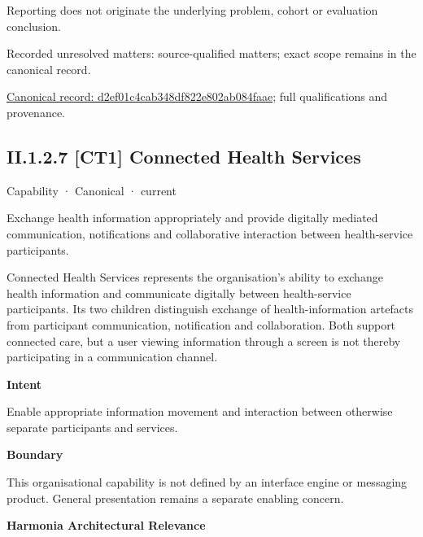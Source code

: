 Reporting does not originate the underlying problem, cohort or evaluation conclusion.


{\small Recorded unresolved matters: source-qualified matters; exact scope remains in the canonical record.}\par
{\footnotesize \href{../../../../continuum/strategy/capability/d2ef01c4cab348df822e802ab084faae.md}{Canonical record: d2ef01c4cab348df822e802ab084faae}; full qualifications and provenance.}\par
\subsection*{II.1.2.7 [CT1] Connected Health Services}
\label{navigation:II.1.2.7}

\label{element:3ef397463e584737b367e93f0bf1d85d}
{\small Capability · Canonical · current}\par

Exchange health information appropriately and provide digitally mediated communication, notifications and collaborative interaction between health-service participants.



Connected Health Services represents the organisation's ability to exchange health information and communicate digitally between health-service participants. Its two children distinguish exchange of health-information artefacts from participant communication, notification and collaboration. Both support connected care, but a user viewing information through a screen is not thereby participating in a communication channel.



\textbf{Intent}



Enable appropriate information movement and interaction between otherwise separate participants and services.



\textbf{Boundary}



This organisational capability is not defined by an interface engine or messaging product. General presentation remains a separate enabling concern.



\textbf{Harmonia Architectural Relevance}



